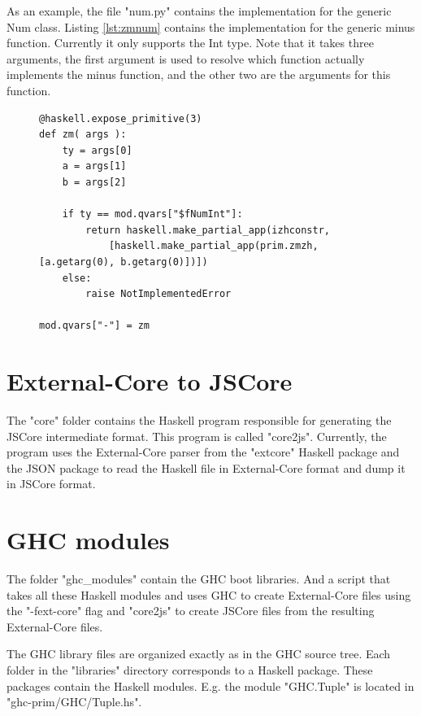 As an example, the file "num.py" contains the implementation for the generic
Num class. Listing \ref{lst:zmnum} contains the implementation for the
generic minus function. Currently it only supports the Int type. Note that
it takes three arguments, the first argument is used to resolve which 
function actually implements the minus function, and the other two are the
arguments for this function.

\begin{figure}[H]
\lstset{ %
language=Python,
caption=Python class implementing the Haskell Int Value.,
label=lst:zmnum
}
\begin{lstlisting}
@haskell.expose_primitive(3)
def zm( args ):
    ty = args[0]
    a = args[1]
    b = args[2]

    if ty == mod.qvars["$fNumInt"]:
        return haskell.make_partial_app(izhconstr,
            [haskell.make_partial_app(prim.zmzh, [a.getarg(0), b.getarg(0)])])
    else:
        raise NotImplementedError

mod.qvars["-"] = zm
\end{lstlisting}
\end{figure}

\section{External-Core to JSCore}

The "core" folder contains the Haskell program responsible for generating the
JSCore intermediate format. This program is called "core2js". Currently, the
program uses the External-Core parser from the "extcore" Haskell package and
the JSON package to read the Haskell file in External-Core format and dump it
in JSCore format.

\section{GHC modules}

The folder "ghc\_modules" contain the GHC boot libraries. And a script that 
takes all these Haskell modules and uses GHC to create External-Core files
using the "-fext-core" flag and "core2js" to create JSCore files from the 
resulting External-Core files.

The GHC library files are organized exactly as in the GHC source tree. Each
folder in the "libraries" directory corresponds to a Haskell package. These
packages contain the Haskell modules. E.g. the module "GHC.Tuple" is located
in "ghc-prim/GHC/Tuple.hs".

